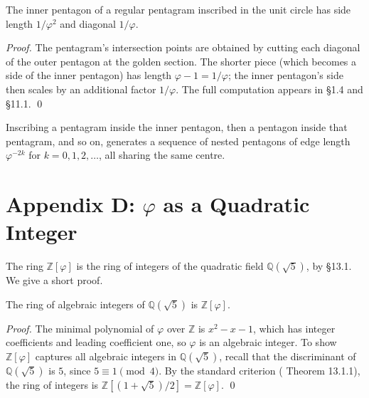 \begin{lemma}
\label{lem:01-pentagram-self}
The inner pentagon of a regular pentagram inscribed in the unit
circle has side length $1/\varphi^2$ and diagonal $1/\varphi$.
\end{lemma}

\begin{proof}
The pentagram's intersection points are obtained by cutting each
diagonal of the outer pentagon at the golden section. The shorter
piece (which becomes a side of the inner pentagon) has length $\varphi
- 1 = 1/\varphi$; the inner pentagon's side then scales by an
additional factor $1/\varphi$. The full computation appears in
\cite{coxeter_intro_geometry} \S 1.4 and
\cite{coxeter_regular_polytopes} \S 11.1.
\qed
\end{proof}

\begin{corollary}\label{cor:01-cascade}
Inscribing a pentagram inside the inner pentagon, then a pentagon
inside that pentagram, and so on, generates a sequence of nested
pentagons of edge length $\varphi^{-2k}$ for $k = 0, 1, 2, \ldots$,
all sharing the same centre.
\end{corollary}

\section*{Appendix D: $\varphi$ as a Quadratic Integer}
\label{sec:01-app-D}

The ring $\mathbb{Z}[\varphi]$ is the ring of integers of the
quadratic field $\mathbb{Q}(\sqrt 5)$, by
\cite{ireland_rosen} \S 13.1. We give a short proof.

\begin{theorem}
\label{thm:01-ring-int}
The ring of algebraic integers of $\mathbb{Q}(\sqrt 5)$ is
$\mathbb{Z}[\varphi]$.
\end{theorem}

\begin{proof}
The minimal polynomial of $\varphi$ over $\mathbb{Z}$ is $x^2 - x -
1$, which has integer coefficients and leading coefficient one, so
$\varphi$ is an algebraic integer. To show $\mathbb{Z}[\varphi]$
captures all algebraic integers in $\mathbb{Q}(\sqrt 5)$, recall that
the discriminant of $\mathbb{Q}(\sqrt 5)$ is $5$, since $5 \equiv 1
\pmod{4}$. By the standard criterion
(\cite{ireland_rosen} Theorem 13.1.1), the ring of integers is
$\mathbb{Z}[(1 + \sqrt 5)/2] = \mathbb{Z}[\varphi]$.
\qed
\end{proof}

